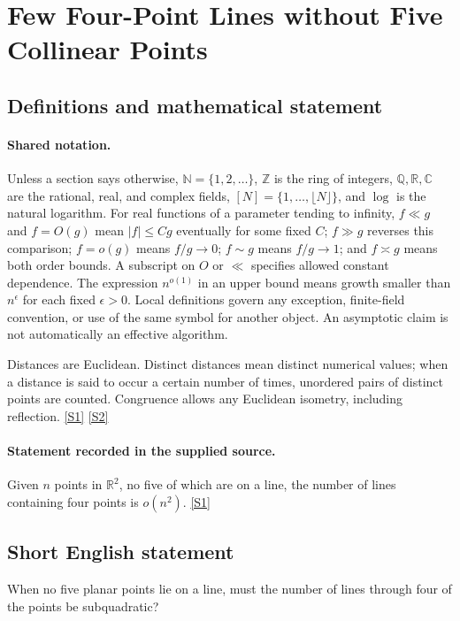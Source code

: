 \documentclass[11pt,a4paper]{article}
\newcommand{\N}{\mathbb{N}}
\newcommand{\Z}{\mathbb{Z}}
\newcommand{\Q}{\mathbb{Q}}
\newcommand{\R}{\mathbb{R}}
\newcommand{\C}{\mathbb{C}}
\newcommand{\sref}[2]{\hyperlink{source:#1:#2}{[S#2]}}
\begin{document}
\section{Few Four-Point Lines without Five Collinear Points}\label{statement}


\subsection{Definitions and mathematical statement}

\paragraph{Shared notation.}Unless a section says otherwise, $\N=\{1,2,\ldots\}$,
$\Z$ is the ring of integers, $\Q,\R,\C$ are the rational, real, and complex
fields, $[N]=\{1,\ldots,\lfloor N\rfloor\}$, and $\log$ is the natural
logarithm. For real functions of a parameter tending to infinity,
$f\ll g$ and $f=O(g)$ mean $|f|\leq Cg$ eventually for some fixed $C$;
$f\gg g$ reverses this comparison; $f=o(g)$ means $f/g\to0$;
$f\sim g$ means $f/g\to1$; and $f\asymp g$ means both order bounds.
A subscript on $O$ or $\ll$ specifies allowed constant dependence.
The expression $n^{o(1)}$ in an upper bound means growth smaller than
$n^\epsilon$ for each fixed $\epsilon>0$. Local definitions govern any
exception, finite-field convention, or use of the same symbol for another
object. An asymptotic claim is not automatically an effective algorithm.



Distances are Euclidean. Distinct distances mean distinct numerical values; when a distance is said to occur a certain number of times, unordered pairs of distinct points are counted. Congruence allows any Euclidean isometry, including reflection. \sref{statement}{1} \sref{statement}{2}

\paragraph{Statement recorded in the supplied source.}
Given $n$ points in $\mathbb{R}^2$, no five of which are on a line, the number of lines containing four points is $o(n^2)$. \sref{statement}{1}

\subsection{Short English statement}

When no five planar points lie on a line, must the number of lines through four of the points be subquadratic?
\end{document}
